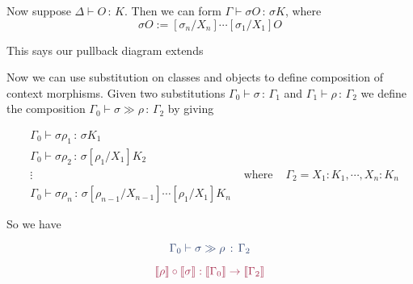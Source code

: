 \message{ !name(LF+Equality_LCCC.tex)}\documentclass{article}
\newcommand{\bbrkt}[1]{\llbracket #1 \rrbracket}
\newcommand{\Subst}[3]{[#1 / #2] #3}
\newcommand{\CtxExt}[3]{#1,#2 : #3}
\newcommand{\ObjJdg}[3]{#1 \vdash #2 \, : \, #3 }
\newcommand{\<}{\langle}
\renewcommand{\>}{\rangle}
\newcommand{\si}{\sigma}
\newcommand{\Ga}{\Gamma}
\newcommand{\De}{\Delta}
\theoremstyle{definitionstyle}
\theoremstyle{exercisestyle}
\theoremstyle{remarkstyle}
\newenvironment{cd}{
    \begin{figure}[H]
    \centering
    \begin{tikzcd}
}{
    \end{tikzcd}
    \end{figure}
}
\begin{document}
Now suppose $\ObjJdg{\De}{O}{K}$.
Then we can form $\ObjJdg{\Ga}{\si O}{\si K}$,
where
\[ \si O := \Subst{\si_{n}}{X_{n}}{ \cdots \Subst{\si_{1}}{X_{1}}{O}}\]

This says our pullback diagram extends


Now we can use substitution on classes and objects to define composition of context morphisms.
Given two substitutions $\ObjJdg{\Ga_{0}}{\si}{\Ga_{1}}$ and $\ObjJdg{\Ga_{1}}{\rho}{\Ga_{2}}$
we define the composition $\ObjJdg{\Ga_{0}}{\si \gg \rho}{\Ga_{2}}$
by giving

\begin{align*}
  &\ObjJdg{\Ga_{0}}{\si{\rho_{1}}}{\si K_{1}}\\
  &\ObjJdg{\Ga_{0}}{\si\rho_{2}}{\si \Subst{\rho_{1}}{X_{1}}{K_{2}}} \\
  &\vdots & \text{ where } & \Ga_{2} = \CtxExt{X_{1}:K_{1}}{\cdots, X_{n}}{K_{n}}\\
  &\ObjJdg{\Ga_{0}}{\si \rho_{n}}{\si \Subst{\rho_{n-1}}{X_{n-1}}{\cdots \Subst{\rho_{1}}{X_{1}}{K_{n}}}}
\end{align*}

So we have

\begin{multicols}{2}
  \[\color{syntax} \ObjJdg{\Ga_{0}}{\si \gg \rho}{\Ga_{2}}\]

   \[ \color{semantics}
    \bbrkt{\rho} \circ \bbrkt{\si} : \bbrkt{\Ga_0} \to \bbrkt{\Ga_2} \]
\end{multicols}
\end{document}
